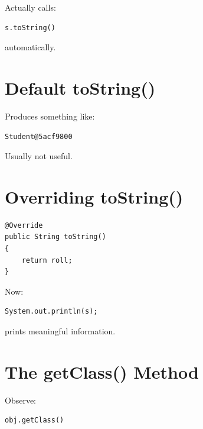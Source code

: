 \documentclass[11pt,a4paper]{book}
\begin{document}
Actually calls:

\begin{verbatim} 
s.toString()
\end{verbatim}


automatically.


\section{Default toString()}

Produces something like:

\begin{verbatim}
Student@5acf9800
\end{verbatim}


Usually not useful.


\section{Overriding toString()}

\begin{verbatim} 
@Override
public String toString()
{
    return roll;
}
\end{verbatim}


Now:

\begin{verbatim} 
System.out.println(s);
\end{verbatim}


prints meaningful information.


\section{The getClass() Method}

Observe:

\begin{verbatim} 
obj.getClass()
\end{verbatim}
\end{document}
